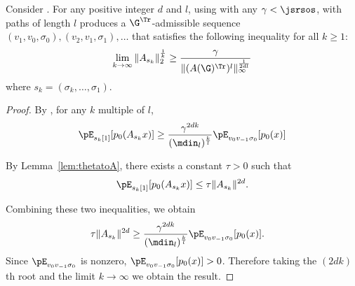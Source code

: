 \begin{theorem}
  \label{theo:fourth}
  Consider .
  For any positive integer $d$ and $l$,
  using  with any $\gamma < \jsrsos$,
   with paths of length $l$
  produces a $\G^\Tr$-admissible sequence
  $(v_1,v_0,\sigma_0), (v_2,v_1,\sigma_1), \ldots$ %
  that satisfies the following inequality for all $k \geq 1$:
  \begin{equation*}
    \lim_{k \to \infty} \|A_{s_k}\|_2^\frac{1}{k} \geq \frac{\gamma}{\|(A(\G)^\Tr)^l\|_\infty^\frac{1}{2dl}}
  \end{equation*}
  where $s_k = (\sigma_k, \ldots, \sigma_1)$.
  \begin{proof}
    By , for any $k$ multiple of $l$, %
    \begin{equation*}
      \pE_{s_k[1]}[p_0(A_{s_k}x)] \geq \frac{\gamma^{2dk}}{(\mdin_l)^\frac{k}{l}} \pE_{v_0v_{-1}\sigma_0}[p_0(x)]
    \end{equation*}

    By Lemma~\ref{lem:thetatoA},
    there exists a constant $\tau > 0$ such that
    \[
      \pE_{s_k[1]}[p_0(A_{s_k} x)] \leq \tau \|A_{s_k}\|^{2d}.
    \]

    Combining these two inequalities, we obtain
    \begin{align*}
      \tau \|A_{s_k}\|^{2d} & \geq \frac{\gamma^{2dk}}{(\mdin_l)^\frac{k}{l}} \pE_{v_0v_{-1}\sigma_0}[p_0(x)].
    \end{align*}
    Since $\pE_{v_0v_{-1}\sigma_0}$ is nonzero, $\pE_{v_0v_{-1}\sigma_0}[p_0(x)] > 0$.
    Therefore taking the $(2dk)$th root and the limit $k \to \infty$
    we obtain the result.
  \end{proof}
\end{theorem}
